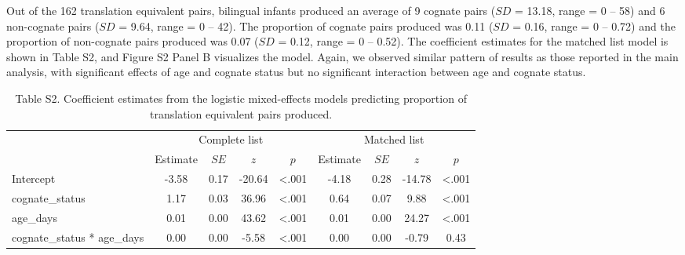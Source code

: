 \documentclass[
  ,man,floatsintext]{apa6}
\begin{document}
Out of the 162 translation equivalent pairs, bilingual infants produced an average of 9 cognate pairs (\(SD\) = 13.18, range = 0 -- 58) and 6 non-cognate pairs (\(SD\) = 9.64, range = 0 -- 42). The proportion of cognate pairs produced was 0.11 (\(SD\) = 0.16, range = 0 -- 0.72) and the proportion of non-cognate pairs produced was 0.07 (\(SD\) = 0.12, range = 0 -- 0.52). The coefficient estimates for the matched list model is shown in Table S2, and Figure S2 Panel B visualizes the model. Again, we observed similar pattern of results as those reported in the main analysis, with significant effects of age and cognate status but no significant interaction between age and cognate status.

\begin{table}[tbp]

\begin{center}
\begin{threeparttable}

\caption{\label{tab:Table S2}Table S2. Coefficient estimates from the logistic mixed-effects models predicting proportion of translation equivalent pairs produced.}

\begin{tabular}{lcccccccc}
\toprule
 & \multicolumn{4}{c}{Complete list} & \multicolumn{4}{c}{Matched list} \\
\cmidrule(r){2-5} \cmidrule(r){6-9}
 & Estimate & $SE$ & $z$ & $p$ & Estimate & $SE$ & $z$ & $p$\\
\midrule
Intercept & -3.58 & 0.17 & -20.64 & <.001 & -4.18 & 0.28 & -14.78 & <.001\\
cognate\_status & 1.17 & 0.03 & 36.96 & <.001 & 0.64 & 0.07 & 9.88 & <.001\\
age\_days & 0.01 & 0.00 & 43.62 & <.001 & 0.01 & 0.00 & 24.27 & <.001\\
cognate\_status * age\_days & 0.00 & 0.00 & -5.58 & <.001 & 0.00 & 0.00 & -0.79 & 0.43\\
\bottomrule
\end{tabular}

\end{threeparttable}
\end{center}

\end{table}
\end{document}
